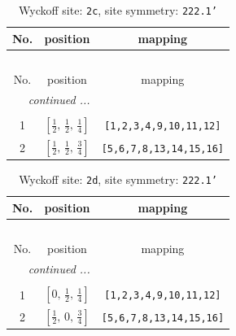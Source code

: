 \documentclass[fleqn,8pt]{jsarticle}
\begin{document}
\renewcommand{\arraystretch}{1.2}
\begin{longtable}{ccc}
\caption{Wyckoff site: {\tt 2c}, site symmetry: {\tt 222.1'}}
 \\
 \hline \hline
No. & position & mapping \\ \hline \endfirsthead

\multicolumn{2}{l}{\tablename\ \thetable{}} \\
 \hline \hline
No. & position & mapping \\ \hline \endhead

 \hline \hline
\multicolumn{2}{r}{\footnotesize\it continued ...} \\ \endfoot

 \hline \hline
\multicolumn{2}{r}{} \\ \endlastfoot

1 & $\left[ \frac{1}{2},\, \frac{1}{2},\, \frac{1}{4} \right]$ & {\tt [1,2,3,4,9,10,11,12]} \\ \hline
2 & $\left[ \frac{1}{2},\, \frac{1}{2},\, \frac{3}{4} \right]$ & {\tt [5,6,7,8,13,14,15,16]} \\
\end{longtable}
\renewcommand{\arraystretch}{1.2}
\begin{longtable}{ccc}
\caption{Wyckoff site: {\tt 2d}, site symmetry: {\tt 222.1'}}
 \\
 \hline \hline
No. & position & mapping \\ \hline \endfirsthead

\multicolumn{2}{l}{\tablename\ \thetable{}} \\
 \hline \hline
No. & position & mapping \\ \hline \endhead

 \hline \hline
\multicolumn{2}{r}{\footnotesize\it continued ...} \\ \endfoot

 \hline \hline
\multicolumn{2}{r}{} \\ \endlastfoot

1 & $\left[ 0,\, \frac{1}{2},\, \frac{1}{4} \right]$ & {\tt [1,2,3,4,9,10,11,12]} \\ \hline
2 & $\left[ \frac{1}{2},\, 0,\, \frac{3}{4} \right]$ & {\tt [5,6,7,8,13,14,15,16]} \\
\end{longtable}
\renewcommand{\arraystretch}{1.2}
\end{document}
